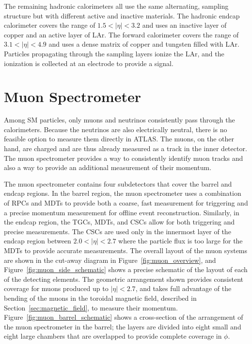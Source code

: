 The remaining hadronic calorimeters all use the same alternating, sampling structure but with different active and inactive materials.
The hadronic endcap calorimeter covers the range of $1.5 < |\eta| < 3.2$ and uses an inactive layer of copper and an active layer of \acl{LAr}.
The forward calorimeter covers the range of $3.1 < |\eta| < 4.9$ and uses a dense matrix of copper and tungsten filled with \acl{LAr}. 
Particles propagating through the sampling layers ionize the \acl{LAr}, and the ionization is collected at an electrode to provide a signal.


\section{Muon Spectrometer}

Among \ac{SM} particles, only muons and neutrinos consistently pass through the calorimeters.
Because the neutrinos are also electrically neutral, there is no feasible option to measure them directly in ATLAS.
The muons, on the other hand, are charged and are thus already measured as a track in the inner detector.
The muon spectrometer provides a way to consistently identify muon tracks and also a way to provide an additional measurement of their momentum.

The muon spectrometer contains four subdetectors that cover the barrel and endcap regions.
In the barrel region, the muon spectrometer uses a combination of \acp{RPC} and \acp{MDT} to provide both a coarse, fast measurement for triggering and a precise momentum measurement for offline event reconstruction.
Similarly, in the endcap region, the \acp{TGC}, \acp{MDT}, and \acp{CSC} allow for both triggering and precise measurements.
The \acp{CSC} are used only in the innermost layer of the endcap region between $2.0 < |\eta| < 2.7$ where the particle flux is too large for the \acp{MDT} to provide accurate measurements.
The overall layout of the muon systems are shown in the cut-away diagram in Figure~\ref{fig:muon_overview}, and Figure~\ref{fig:muon_side_schematic} shows a precise schematic of the layout of each of the detecting elements.
The geometric arrangement shown provides consistent coverage for muons produced up to $|\eta| < 2.7$, and takes full advantage of the bending of the muons in the toroidal magnetic field, described in Section~\ref{sec:magnetic_field}, to measure their momentum.
Figure~\ref{fig:muon_barrel_schematic} shows a cross-section of the arrangement of the muon spectrometer in the barrel; the layers are divided into eight small and eight large chambers that are overlapped to provide complete coverage in $\phi$. 


